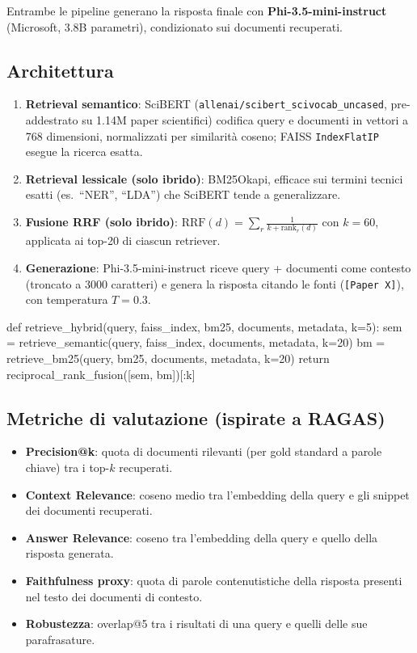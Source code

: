 \documentclass[12pt,a4paper]{article}
\begin{document}
Entrambe le pipeline generano la risposta finale con \textbf{Phi-3.5-mini-instruct} (Microsoft, 3.8B parametri), condizionato sui documenti recuperati.

\subsection{Architettura}

\begin{enumerate}[noitemsep]
  \item \textbf{Retrieval semantico}: SciBERT (\texttt{allenai/scibert\_scivocab\_uncased}, pre-addestrato su 1.14M paper scientifici) codifica query e documenti in vettori a 768 dimensioni, normalizzati per similarit\`a coseno; FAISS \texttt{IndexFlatIP} esegue la ricerca esatta.
  \item \textbf{Retrieval lessicale (solo ibrido)}: BM25Okapi, efficace sui termini tecnici esatti (es.\ ``NER'', ``LDA'') che SciBERT tende a generalizzare.
  \item \textbf{Fusione RRF (solo ibrido)}: $\text{RRF}(d) = \sum_r \frac{1}{k + \text{rank}_r(d)}$ con $k=60$, applicata ai top-20 di ciascun retriever.
  \item \textbf{Generazione}: Phi-3.5-mini-instruct riceve query + documenti come contesto (troncato a 3000 caratteri) e genera la risposta citando le fonti (\texttt{[Paper X]}), con temperatura $T=0.3$.
\end{enumerate}

\begin{pylisting}[title={Retrieval ibrido con Reciprocal Rank Fusion}]
def retrieve_hybrid(query, faiss_index, bm25, documents, metadata, k=5):
    sem = retrieve_semantic(query, faiss_index, documents, metadata, k=20)
    bm  = retrieve_bm25(query, bm25, documents, metadata, k=20)
    return reciprocal_rank_fusion([sem, bm])[:k]
\end{pylisting}

\subsection{Metriche di valutazione (ispirate a RAGAS)}

\begin{itemize}[noitemsep]
  \item \textbf{Precision@k}: quota di documenti rilevanti (per gold standard a parole chiave) tra i top-$k$ recuperati.
  \item \textbf{Context Relevance}: coseno medio tra l'embedding della query e gli snippet dei documenti recuperati.
  \item \textbf{Answer Relevance}: coseno tra l'embedding della query e quello della risposta generata.
  \item \textbf{Faithfulness proxy}: quota di parole contenutistiche della risposta presenti nel testo dei documenti di contesto.
  \item \textbf{Robustezza}: overlap@5 tra i risultati di una query e quelli delle sue parafrasature.
\end{itemize}
\end{document}
